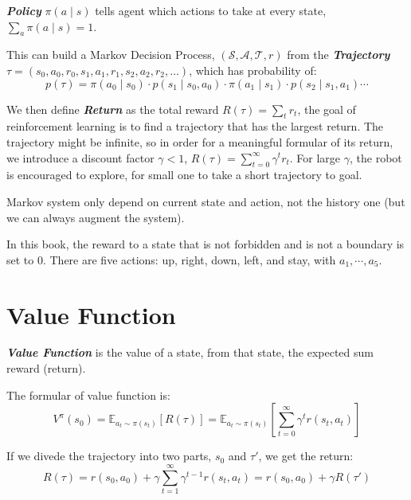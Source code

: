 \documentclass[10pt]{elegantbook}
\newcommand{\mydefination}[1]{\textbf{\textit{\textcolor{structurecolor}{#1}}}}
\begin{document}
\mydefination{Policy} $\pi(a \mid s)$ tells agent which actions to take at every state, $\sum_a \pi(a \mid s) = 1$.

This can build a Markov Decision Process, $(\mathcal S, \mathcal A, \mathcal T, r)$ from the \mydefination{Trajectory} 
$\tau = (s_0, a_0, r_0, s_1, a_1, r_1, s_2, a_2, r_2, \ldots)$, which has probability of:
\[ p(\tau) = \pi(a_0\mid s_0) \cdot p(s_1 \mid s_0, a_0) \cdot \pi(a_1\mid s_1) \cdot p(s_2 \mid s_1, a_1) \cdots \] 

We then define \mydefination{Return} as the total reward $R(\tau) = \sum_t r_t$, 
the goal of reinforcement learning is to find a trajectory that has the largest return. The trajectory might be infinite, so in order for a 
meaningful formular of its return, we introduce a discount factor $\gamma < 1$, $R(\tau) = \sum_{t=0}^{\infty}\gamma^tr_t$. For large $\gamma$, 
the robot is encouraged to explore, for small one to take a short trajectory to goal.

Markov system only depend on current state and action, not the history one (but we can always augment the system).

\begin{remark}
    In this book, the reward to a state that is not forbidden and is not a boundary is set to 0. There are five actions: up, right, down, left, and stay, 
    with $a_1, \cdots, a_5$.
\end{remark}

\section{Value Function}
\mydefination{Value Function} is the value of a state, from that state, the expected sum reward (return). 

The formular of value function is:
\begin{equation}
    V^{\pi}(s_0) = \mathbb E_{a_t \sim \pi(s_t)}[R(\tau)] = \mathbb E_{a_t \sim \pi(s_t)}\left[ \sum_{t=0}^{\infty}\gamma^tr(s_t, a_t) \right]
\end{equation} 

If we divede the trajectory into two parts, $s_0$ and $\tau'$, we get the return:
\[ R(\tau) = r(s_0, a_0) + \gamma \sum_{t=1}^{\infty}\gamma^{t-1}r(s_t, a_t) = r(s_0, a_0) + \gamma R(\tau') \]
\end{document}
